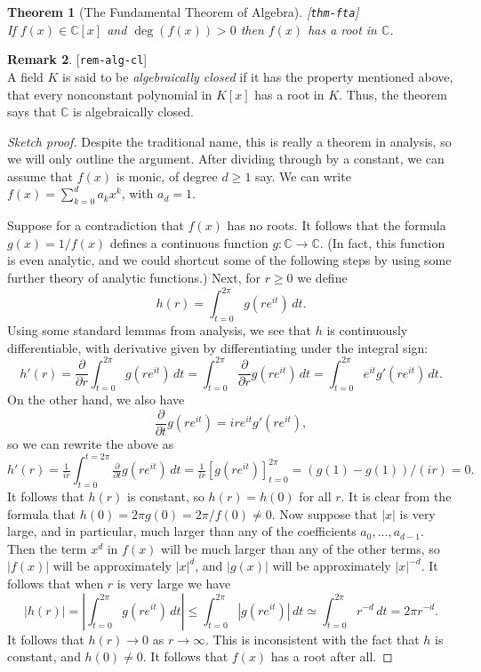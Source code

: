 \documentclass{amsart}
\newcommand{\lbl}[1]{\label{#1}\textup{[\texttt{#1}]}\ \\}
\newcommand{\lbl}{\label}
\newcommand{\C}         {{\mathbb{C}}}
\renewcommand{\:}{\colon}
\newtheorem{theorem}{Theorem}[section]
\theoremstyle{definition}
\newtheorem{remark}[theorem]{Remark}
\begin{document}
\begin{theorem}[The Fundamental Theorem of Algebra]\lbl{thm-fta}
 If $f(x)\in\C[x]$ and $\deg(f(x))>0$ then $f(x)$ has a root in $\C$.
\end{theorem}
\begin{remark}\lbl{rem-alg-cl}
 A field $K$ is said to be \emph{algebraically closed} if it has the
 property mentioned above, that every nonconstant polynomial in $K[x]$
 has a root in $K$.  Thus, the theorem says that $\C$ is algebraically
 closed. 
\end{remark}
\begin{proof}[Sketch proof]
 Despite the traditional name, this is really a theorem in analysis,
 so we will only outline the argument.  After dividing through by a
 constant, we can assume that $f(x)$ is monic, of degree $d\geq 1$
 say.  We can write $f(x)=\sum_{k=0}^da_kx^k$, with $a_d=1$.  

 Suppose for a contradiction that $f(x)$ has no roots.  It follows
 that the formula $g(x)=1/f(x)$ defines a continuous function
 $g\:\C\to\C$.  (In fact, this function is even analytic, and we could
 shortcut some of the following steps by using some further theory of
 analytic functions.)  Next, for $r\geq 0$ we define
 \[ h(r) = \int_{t=0}^{2\pi} g(re^{it})\,dt. \]
 Using some standard lemmas from analysis, we see that $h$ is
 continuously differentiable, with derivative given by differentiating
 under the integral sign:
 \[ h'(r)
     = \frac{\partial}{\partial r}\int_{t=0}^{2\pi} g(re^{it})\,dt
     = \int_{t=0}^{2\pi} \frac{\partial}{\partial r} g(re^{it})\,dt
     = \int_{t=0}^{2\pi} e^{it} g'(re^{it})\,dt.
 \]
 On the other hand, we also have 
 \[ \frac{\partial}{\partial t} g(re^{it}) = 
     ire^{it} g'(re^{it}),
 \]
 so we can rewrite the above as 
 \[ h'(r) =
    \tfrac{1}{ir}
     \int_{t=0}^{t=2\pi} \tfrac{\partial}{\partial t} g(re^{it})\,dt 
    = \tfrac{1}{ir}\left[ g(re^{it})\right]_{t=0}^{2\pi}
    = (g(1)-g(1))/(ir) = 0.
 \]
 It follows that $h(r)$ is constant, so $h(r)=h(0)$ for all $r$.  It
 is clear from the formula that $h(0)=2\pi g(0)=2\pi/f(0)\neq 0$.  Now
 suppose that $|x|$ is very large, and in particular, much larger than
 any of the coefficients $a_0,\dotsc,a_{d-1}$.  Then the term $x^d$ in
 $f(x)$ will be much larger than any of the other terms, so $|f(x)|$
 will be approximately $|x|^d$, and $|g(x)|$ will be approximately
 $|x|^{-d}$.  It follows that when $r$ is very large we have 
 \[ |h(r)| = \left|\int_{t=0}^{2\pi}g(re^{it})\,dt\right| \leq
     \int_{t=0}^{2\pi}|g(re^{it})|\,dt \simeq
     \int_{t=0}^{2\pi}r^{-d}\,dt = 2\pi r^{-d}.
 \]
 It follows that $h(r)\to 0$ as $r\to\infty$.  This is inconsistent
 with the fact that $h$ is constant, and $h(0)\neq 0$.  It follows
 that $f(x)$ has a root after all.
\end{proof}
\end{document}
